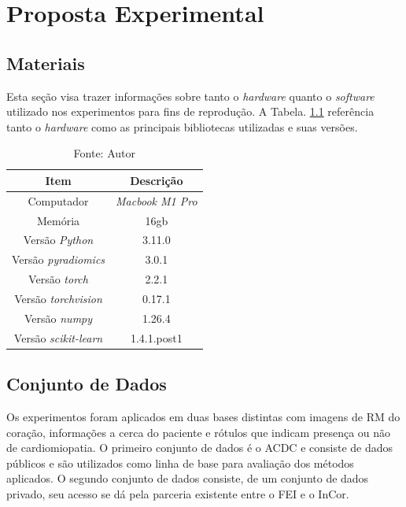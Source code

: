 \chapter{Proposta Experimental}
\label{chap:proposta_experimental}

\section{Materiais} 
\label{sec:cap5_materiais}

Esta seção visa trazer informações sobre tanto o \textit{hardware} quanto o \textit{software} utilizado nos experimentos para fins de reprodução. A Tabela. \ref{tab:hardware_software} referência tanto o \textit{hardware} como as principais bibliotecas utilizadas e suas versões.

\begin{table}[hbtp]
    \centering
    \renewcommand{\arraystretch}{1} %
    \begin{tabular}{|c|c|}
    \hline 
       \textbf{Item} & \textbf{Descrição}\\
    \hline 
       Computador & \textit{Macbook M1 Pro}  \\
    \hline 
       Memória & 16gb  \\
    \hline 
       Versão \textit{Python} & 3.11.0  \\
    \hline 
       Versão \textit{pyradiomics} & 3.0.1 \\
    \hline 
       Versão \textit{torch} & 2.2.1 \\
    \hline 
       Versão \textit{torchvision} & 0.17.1 \\
    \hline 
       Versão \textit{numpy} & 1.26.4 \\
    \hline 
       Versão \textit{scikit-learn} & 1.4.1.post1 \\
    \hline 
    \end{tabular} 
    \caption{Fonte: Autor}
    \label{tab:hardware_software}
\end{table}


\section{Conjunto de Dados} 
\label{sec:cap5_conj_dados}

Os experimentos foram  aplicados em duas bases distintas com imagens de RM do coração, informações a cerca do paciente e rótulos que indicam presença ou não de cardiomiopatia. O primeiro conjunto de dados é o \gls{ACDC} e consiste de dados públicos e são utilizados como linha de base para avaliação dos métodos aplicados. O segundo conjunto de dados consiste, de um conjunto de dados privado, seu acesso
se dá pela parceria existente entre o \gls{FEI} e o \gls{InCor}.

